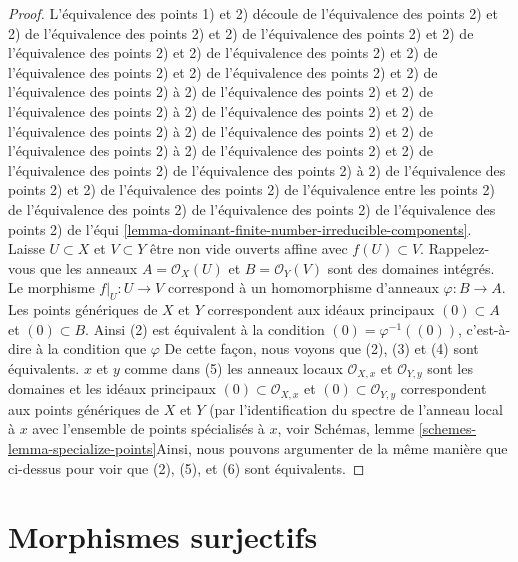 \begin{proof}

L'équivalence des points 1) et 2) découle de l'équivalence des points 2) et 2) de l'équivalence des points 2) et 2) de l'équivalence des points 2) et 2) de l'équivalence des points 2) et 2) de l'équivalence des points 2) et 2) de l'équivalence des points 2) et 2) de l'équivalence des points 2) et 2) de l'équivalence des points 2) à 2) de l'équivalence des points 2) et 2) de l'équivalence des points 2) à 2) de l'équivalence des points 2) et 2) de l'équivalence des points 2) à 2) de l'équivalence des points 2) et 2) de l'équivalence des points 2) à 2) de l'équivalence des points 2) et 2) de l'équivalence des points 2) de l'équivalence des points 2) à 2) de l'équivalence des points 2) et 2) de l'équivalence des points 2) de l'équivalence entre les points 2) de l'équivalence des points 2) de l'équivalence des points 2) de l'équivalence des points 2) de l'équi \ref{lemma-dominant-finite-number-irreducible-components}. Laisse $U \subset X$ et $V \subset Y$ être non vide ouverts affine avec
$f(U) \subset V$. Rappelez-vous que les anneaux $A = \mathcal{O}_X(U)$
et $B = \mathcal{O}_Y(V)$ sont des domaines intégrés. Le morphisme $f|_U : U \to V$ correspond à un homomorphisme d'anneaux
$\varphi : B \to A$. Les points génériques de $X$ et $Y$ correspondent aux idéaux principaux $(0) \subset A$ et $(0) \subset B$. Ainsi (2) est équivalent à la condition $(0) = \varphi^{-1}((0))$, c'est-à-dire à la condition que $\varphi$ De cette façon, nous voyons que (2), (3) et (4) sont équivalents. $x$ et $y$ comme dans (5) les anneaux locaux
$\mathcal{O}_{X, x}$ et $\mathcal{O}_{Y, y}$ sont les domaines et les idéaux principaux $(0) \subset \mathcal{O}_{X, x}$
et $(0) \subset \mathcal{O}_{Y, y}$ correspondent aux points génériques de $X$ et $Y$ (par l'identification du spectre de l'anneau local à $x$
avec l'ensemble de points spécialisés à $x$, voir Schémas, lemme \ref{schemes-lemma-specialize-points}Ainsi, nous pouvons argumenter de la même manière que ci-dessus pour voir que (2), (5), et (6) sont équivalents.

\end{proof}







\section{Morphismes surjectifs}
\label{section-surjective}

